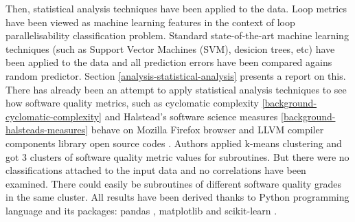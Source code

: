 \null\qquad Then, statistical analysis techniques have been applied to the data. Loop metrics have been viewed as machine learning features in the context of loop parallelisability classification problem. Standard state-of-the-art  machine learning techniques (such as Support Vector Machines (SVM), desicion trees, etc) have been applied to the data and all prediction errors have been compared agains random predictor. Section \ref{analysis-statistical-analysis} presents a report on this. \newline
\null\qquad There has already been an attempt to apply statistical analysis techniques to see how software quality metrics, such as cyclomatic complexity \ref{background-cyclomatic-complexity} and Halstead's software science measures \ref{background-halsteads-measures} behave on Mozilla Firefox browser and LLVM compiler components library open source codes \cite{source-code-quality-classification-paper}. Authors applied k-means clustering and got 3 clusters of software quality metric values for subroutines. But there were no classifications attached to the input data and no correlations have been examined. There could easily be subroutines of different software quality grades in the same cluster. \newline
\null\qquad All results have been derived thanks to Python programming language and its packages: pandas \cite{python-lib-pandas}, matplotlib \cite{python-matplotlib} and scikit-learn \cite{python-lib-scikit-learn}. 

